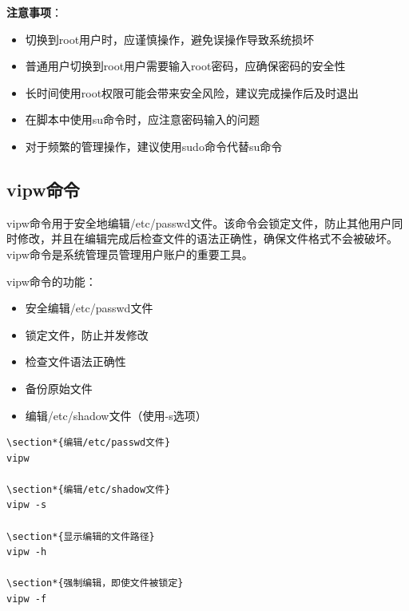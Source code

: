 \documentclass[12pt,UTF8]{ctexbook}
\begin{document}
\textbf{注意事项}：
\begin{itemize}
    \item 切换到root用户时，应谨慎操作，避免误操作导致系统损坏
    \item 普通用户切换到root用户需要输入root密码，应确保密码的安全性
    \item 长时间使用root权限可能会带来安全风险，建议完成操作后及时退出
    \item 在脚本中使用su命令时，应注意密码输入的问题
    \item 对于频繁的管理操作，建议使用sudo命令代替su命令
\end{itemize}

\subsection{vipw命令}
vipw命令用于安全地编辑/etc/passwd文件。该命令会锁定文件，防止其他用户同时修改，并且在编辑完成后检查文件的语法正确性，确保文件格式不会被破坏。vipw命令是系统管理员管理用户账户的重要工具。

vipw命令的功能：
\begin{itemize}
    \item 安全编辑/etc/passwd文件
    \item 锁定文件，防止并发修改
    \item 检查文件语法正确性
    \item 备份原始文件
    \item 编辑/etc/shadow文件（使用-s选项）
\end{itemize}

\begin{verbatim}
\section*{编辑/etc/passwd文件}
vipw

\section*{编辑/etc/shadow文件}
vipw -s

\section*{显示编辑的文件路径}
vipw -h

\section*{强制编辑，即使文件被锁定}
vipw -f
\end{verbatim}
\end{document}
